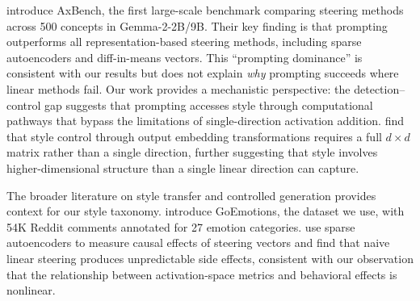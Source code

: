 \citet{wu2025axbench} introduce AxBench, the first large-scale benchmark comparing steering methods across 500 concepts in Gemma-2-2B/9B. Their key finding is that prompting outperforms all representation-based steering methods, including sparse autoencoders and diff-in-means vectors. This ``prompting dominance'' is consistent with our results but does not explain \emph{why} prompting succeeds where linear methods fail. Our work provides a mechanistic perspective: the detection--control gap suggests that prompting accesses style through computational pathways that bypass the limitations of single-direction activation addition. \citet{han2023word} find that style control through output embedding transformations requires a full $d \times d$ matrix rather than a single direction, further suggesting that style involves higher-dimensional structure than a single linear direction can capture.

The broader literature on style transfer and controlled generation provides context for our style taxonomy. \citet{demszky2020goemotions} introduce GoEmotions, the dataset we use, with 54K Reddit comments annotated for 27 emotion categories. \citet{chalnev2024improving} use sparse autoencoders to measure causal effects of steering vectors and find that naive linear steering produces unpredictable side effects, consistent with our observation that the relationship between activation-space metrics and behavioral effects is nonlinear.
